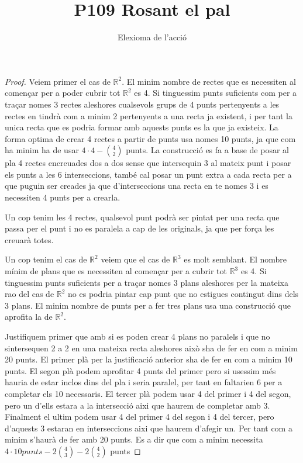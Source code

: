 \documentclass[12pt, a4papre]{article}
\author{Elexioma de l'acció}
\title{P109 Rosant el pal}
\date{}
\begin{document}
	\maketitle
	
	
	\begin{proof} Veiem primer el cas de $\mathbb{R}^2$. El minim nombre de rectes que es necessiten al començar per a poder cubrir tot $\mathbb{R}^2$ es 4. Si tinguessim punts suficients com per a traçar nomes 3 rectes aleshores cualsevols grups de 4 punts pertenyents a les rectes en tindrà com a minim 2 pertenyents a una recta ja existent, i per tant la unica recta que es podria formar amb aquests punts es la que ja existeix. La forma optima de crear 4 rectes a partir de punts usa nomes 10 punts, ja que com ha minim ha de usar $4\cdot4 - {4\choose 2}$ punts. La construcció es fa a base de posar al pla 4 rectes encreuades dos a dos sense que intersequin 3 al mateix punt i posar els punts a les 6 interseccions, també cal posar un punt extra a cada recta per a que puguin ser creades ja que d'interseccions una recta en te nomes 3 i es necessiten 4 punts per a crearla. 
	
	Un cop tenim les 4 rectes, qualsevol punt podrà ser pintat per una recta que passa per el punt i no es paralela a cap de les originals, ja que per força les creuarà totes.
	
	Un cop tenim el cas de $\mathbb{R}^2$ veiem que el cas de $\mathbb{R}^3$ es molt semblant. El nombre mínim de plans que es necessiten al començar per a cubrir tot $\mathbb{R}^3$ es 4. Si tinguessim punts suficients per a traçar nomes 3 plans aleshores per la mateixa rao del cas de $\mathbb{R}^2$ no es podria pintar cap punt que no estigues contingut dins dels 3 plans. El minim nombre de punts per a fer tres plans usa una construcció que aprofita la de $\mathbb{R}^2$. 
	
	Justifiquem primer que amb si es poden crear 4 plans no paralels i que no sintersequen 2 a 2 en una mateixa recta aleshores això sha de fer en com a minim 20 punts. El primer plà per la justificació anterior sha de fer en com a minim 10 punts. El segon plà podem aprofitar 4 punts del primer pero si usessim més hauria de estar inclos dins del pla i seria paralel, per tant en faltarien 6 per a completar els 10 necessaris. El tercer plà podem usar 4 del primer i 4 del segon, pero un d'ells estara a la intersecció aixi que haurem de completar amb 3. Finalment el ultim podem usar 4 del primer 4 del segon i 4 del tercer, pero d'aquests 3 estaran en interseccions aixi que haurem d'afegir un. Per tant com a minim s'haurà de fer amb 20 punts. Es a dir que com a minim necessita $4\cdot10 punts -  2{4\choose 3} - 2 {4\choose 2}$ punts
	

\end{proof}
\end{document}
